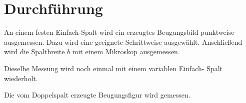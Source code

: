 \section{Durchführung}
\label{sec:Durchführung}

An einem festen Einfach-Spalt wird ein erzeugtes Beugungsbild 
punktweise ausgemessen. Dazu wird eine geeignete Schrittweise 
ausgewählt. 
Anschließend wird die Spaltbreite $b$ mit einem Mikroskop 
ausgemessen. 

Dieselbe Messung wird noch einmal mit einem variablen Einfach-
Spalt wiederholt.

Die vom Doppelspalt erzeugte Beugungsfigur wird gemessen. 
